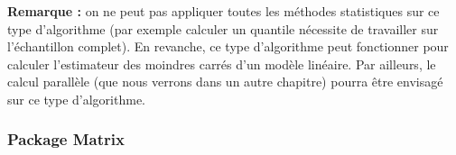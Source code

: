 \documentclass[
]{book}
\newenvironment{Shaded}{\begin{snugshade}}{\end{snugshade}}
\newcommand{\AttributeTok}[1]{\textcolor[rgb]{0.77,0.63,0.00}{#1}}
\newcommand{\ControlFlowTok}[1]{\textcolor[rgb]{0.13,0.29,0.53}{\textbf{#1}}}
\newcommand{\DecValTok}[1]{\textcolor[rgb]{0.00,0.00,0.81}{#1}}
\newcommand{\FunctionTok}[1]{\textcolor[rgb]{0.00,0.00,0.00}{#1}}
\newcommand{\NormalTok}[1]{#1}
\newcommand{\OtherTok}[1]{\textcolor[rgb]{0.56,0.35,0.01}{#1}}
\newcommand{\SpecialCharTok}[1]{\textcolor[rgb]{0.00,0.00,0.00}{#1}}
\newcommand{\StringTok}[1]{\textcolor[rgb]{0.31,0.60,0.02}{#1}}
\theoremstyle{definition}
\theoremstyle{definition}
\theoremstyle{definition}
\theoremstyle{definition}
\theoremstyle{remark}
\begin{document}
\textbf{Remarque :} on ne peut pas appliquer toutes les méthodes statistiques sur ce type d'algorithme (par exemple calculer un quantile nécessite de travailler sur l'échantillon complet). En revanche, ce type d'algorithme peut fonctionner pour calculer l'estimateur des moindres carrés d'un modèle linéaire. Par ailleurs, le calcul parallèle (que nous verrons dans un autre chapitre) pourra être envisagé sur ce type d'algorithme.

\begin{Shaded}
\end{Shaded}

\hypertarget{package-matrix}{%
\subsubsection{\texorpdfstring{Package \textbf{Matrix}}{Package Matrix}}\label{package-matrix}}
\end{document}
